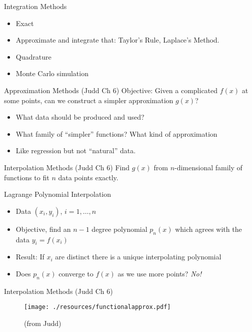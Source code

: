 \begin{frame}{Integration Methods}
\begin{itemize}
\item Exact
\item Approximate and integrate that: Taylor's Rule, Laplace's Method.
\item Quadrature
\item Monte Carlo simulation
\end{itemize}
\end{frame}

\begin{frame}{Approximation Methods (Judd Ch 6)}
Objective: Given a complicated $f(x)$ at some points, can we construct a simpler approximation $g(x)$?
\begin{itemize}
\item What data should be produced and used?
\item What family of ``simpler'' functions? What kind of approximation
\item Like regression but not ``natural'' data.
\end{itemize}
\end{frame}

\begin{frame}{Interpolation Methods  (Judd Ch 6)}
Find $g(x)$ from $n$-dimensional family of functions to fit $n$ data points exactly.
\begin{block}{Lagrange Polynomial Interpolation}
\begin{itemize}
\item Data $(x_i,y_i)$, $i=1,\ldots,n$
\item Objective, find an $n-1$ degree polynomial $p_n(x)$ which agrees with the data $y_i = f(x_i)$
\item Result: If $x_i$ are distinct there is a unique interpolating polynomial
\item Does $p_n(x)$ converge to $f(x)$ as we use more points? \textit{No!}
\end{itemize}
\end{block}
\end{frame}

\begin{frame}{Interpolation Methods  (Judd Ch 6)}
\begin{figure}[htbp]
\begin{center}
\caption{(from Judd)}
\texttt{[image: ./resources/functionalapprox.pdf]}
\end{center}
\end{figure}
\end{frame}

